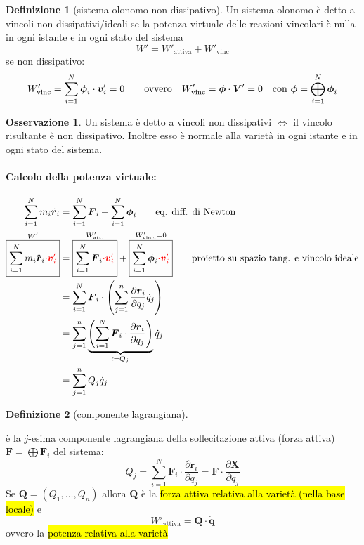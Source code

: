 \documentclass[a4paper,10pt]{article}
\theoremstyle{definition}
\newcommand{\bv}{\boldsymbol} %
\theoremstyle{indentdefinition}
\newtheorem{defn}{Definizione}[section]
\theoremstyle{indenttheorem}
\theoremstyle{myremark}
\newtheorem*{rem*}{Osservazione}
\theoremstyle{indentgeneral}
\begin{document}
\begin{defn}[sistema olonomo non dissipativo]
\label{def:sistema-olonomo-non-dissipativo}Un sistema olonomo è
detto a vincoli non dissipativi/ideali se la potenza virtuale delle reazioni
vincolari è nulla in ogni istante e in ogni stato del sistema
$$W'=W'_{\text{attiva}}+W'_{\text{vinc}}$$
se non dissipativo:
\[
W'_{\text{vinc}}=\sum_{i=1}^{N}\boldsymbol{\phi}_{i}\cdot\boldsymbol{v}'_{i}=0\qquad\text{ovvero}\quad W'_{\text{vinc}}=\boldsymbol{\phi}\cdot\boldsymbol{V}'=0\quad\text{con \ensuremath{\boldsymbol{\phi}=\bigoplus_{i=1}^{N}\boldsymbol{\phi}_{i}}}
\]
\end{defn}

\begin{rem*}
Un sistema è detto a vincoli non dissipativi $\Longleftrightarrow$
il vincolo risultante è non dissipativo. Inoltre esso è normale alla
varietà in ogni istante e in ogni stato del sistema.
\end{rem*}

\paragraph{Calcolo della potenza virtuale:} 
\begin{align*}
    \sum_{i=1}^Nm_i\ddot{\bv{r}}_i &= \sum_{i=1}^N\bv{F}_i+\sum_{i=1}^N\bv{\phi}_i \quad\quad  \text{eq. diff. di Newton} \\
     \overset{W'}{\boxed{\sum_{i=1}^Nm_i\ddot{\bv{r}}_i\textcolor{red}{\cdot\bv{v}'_i}}} &= \overset{W'_{\text{att.}}}{\boxed{\sum_{i=1}^N\bv{F}_i\textcolor{red}{\cdot\bv{v}'_i}}}+\overset{W'_{\text{vinc.}}=0}{\boxed{\sum_{i=1}^N\bv{\phi}_i\textcolor{red}{\cdot\bv{v}'_i}}}\quad\quad  \text{proietto su spazio tang. e vincolo ideale} \\
     &=\sum_{i=1}^N\bv{F}_i\cdot \left(\sum_{j=1}^n\frac{\partial \bv{r}_i}{\partial q_j}\dot{q}_j\right) \\
     &= \sum_{j=1}^n \underbrace{\left(\sum_{i=1}^N\bv{F}_i\cdot\frac{\partial \bv{r}_i}{\partial q_j}\right)}_{\coloneqq Q_j}\dot{q}_j \\
     &=\sum_{j=1}^n Q_j\dot{q}_j \\
\end{align*}

\begin{defn}[componente lagrangiana]
\label{def:componente-lagrangiana}

è la $j$-esima componente lagrangiana della sollecitazione attiva (forza attiva) $\bv{F}=\bigoplus\bv{F}_i$ del
sistema: 
$$Q_{j}=\sum_{i=1}^{N}\boldsymbol{F}_{i}\cdot\frac{\partial\boldsymbol{r}_{i}}{\partial q_{j}}=\bv{F}\cdot\frac{\partial\bv{X}}{\partial q_j}$$
Se $\bv{Q}=(Q_1,\dots,Q_n)$ allora $\bv{Q}$ è la \hl{forza attiva relativa alla varietà (nella base locale)} e $$W'_{\text{attiva}}=\bv{Q}\cdot \dot{\bv{q}}$$
ovvero la \hl{potenza relativa alla varietà}
\end{defn}
\end{document}
